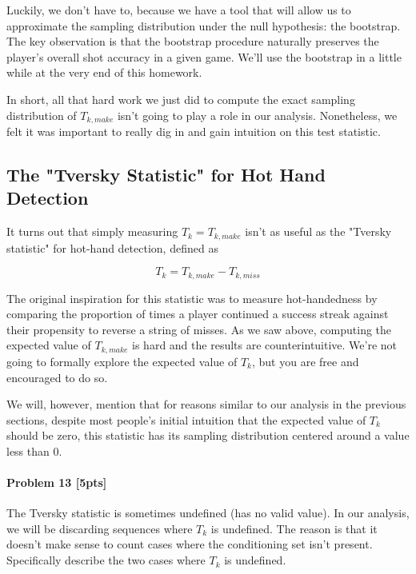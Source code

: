 \documentclass[11pt]{article}
\begin{document}
Luckily, we don't have to, because we have a tool that will allow us to
approximate the sampling distribution under the null hypothesis: the
bootstrap. The key observation is that the bootstrap procedure naturally
preserves the player's overall shot accuracy in a given game. We'll use
the bootstrap in a little while at the very end of this homework.

In short, all that hard work we just did to compute the exact sampling
distribution of \(T_{k, make}\) isn't going to play a role in our
analysis. Nonetheless, we felt it was important to really dig in and
gain intuition on this test statistic.

\subsection{The "Tversky Statistic" for Hot Hand
Detection}\label{the-tversky-statistic-for-hot-hand-detection}

It turns out that simply measuring \(T_k = T_{k, make}\) isn't as useful
as the "Tversky statistic" for hot-hand detection, defined as

\[T_k = T_{k, make} - T_{k, miss}\]

The original inspiration for this statistic was to measure
hot-handedness by comparing the proportion of times a player continued a
success streak against their propensity to reverse a string of misses.
As we saw above, computing the expected value of \(T_{k, make}\) is hard
and the results are counterintuitive. We're not going to formally
explore the expected value of \(T_k\), but you are free and encouraged
to do so.

We will, however, mention that for reasons similar to our analysis in
the previous sections, despite most people's initial intuition that the
expected value of \(T_k\) should be zero, this statistic has its
sampling distribution centered around a value less than 0.

\paragraph{Problem 13 {[}5pts{]}}\label{problem-13-5pts}

The Tversky statistic is sometimes undefined (has no valid value). In
our analysis, we will be discarding sequences where \(T_k\) is
undefined. The reason is that it doesn't make sense to count cases where
the conditioning set isn't present. Specifically describe the two cases
where \(T_k\) is undefined.
\end{document}
